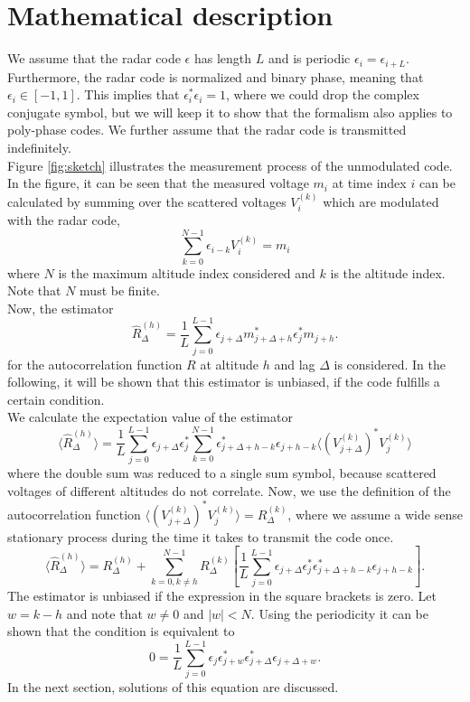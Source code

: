 \documentclass[18pt,a4paper]{extarticle}
\begin{document}
\section{Mathematical description}
We assume that the radar code $\epsilon$ has length $L$ and is periodic $\epsilon_i = \epsilon_{i + L}$.
Furthermore, the radar code is normalized and binary phase, meaning that $\epsilon_i \in [-1, 1]$.
This implies that $\epsilon_i^*\epsilon_i = 1$, where we could drop the complex conjugate symbol, but we will keep it to show that the formalism also applies to poly-phase codes.
We further assume that the radar code is transmitted indefinitely.\\
Figure \ref{fig:sketch} illustrates the measurement process of the unmodulated code.
In the figure, it can be seen that the measured voltage $m_i$ at time index $i$ can be calculated by summing over the scattered voltages $V^{(k)}_i$ which are modulated with the radar code,
\begin{equation}
\sum_{k=0}^{N-1} \epsilon_{i-k} V^{(k)}_i = m_i
\end{equation}
where $N$ is the maximum altitude index considered and $k$ is the altitude index.
Note that $N$ must be finite.\\
Now, the estimator
\begin{equation}
\hat{R}^{(h)}_\Delta = \frac{1}{L}\sum^{L-1}_{j=0}\epsilon_{j + \Delta}m_{j + \Delta + h}^* \epsilon_j^*m_{j + h}.
\end{equation}
for the autocorrelation function $R$ at altitude $h$ and lag $\Delta$ is considered.
In the following, it will be shown that this estimator is unbiased, if the code fulfills a certain condition.\\
We calculate the expectation value of the estimator
\begin{equation}
\langle \hat{R}^{(h)}_\Delta \rangle
=\frac{1}{L}\sum^{L - 1}_{j=0} \epsilon_{j + \Delta}\epsilon_j^* \sum_{k=0}^{N-1} \epsilon_{j+\Delta+h-k}^*\epsilon_{j+h-k} \langle (V^{(k)}_{j + \Delta})^*V^{(k)}_j \rangle
\end{equation}
where the double sum was reduced to a single sum symbol, because scattered voltages of different altitudes do not correlate.
Now, we use the definition of the autocorrelation function $\langle (V_{j+\Delta}^{(k)})^* V_j^{(k)} \rangle = R^{(k)}_\Delta$, where we assume a wide sense stationary process during the time it takes to transmit the code once.
\begin{equation}
\langle \hat{R}^{(h)}_\Delta \rangle
= R^{(h)}_\Delta + \sum_{k=0,k\neq h}^{N-1}R^{(k)}_\Delta
\left[ \frac{1}{L}\sum^{L-1}_{j=0}\epsilon_{j + \Delta}\epsilon_j^* \epsilon_{j+\Delta+h-k}^*\epsilon_{j+h-k}\right].
\end{equation}
The estimator is unbiased if the expression in the square brackets is zero.
Let $w = k - h$ and note that $w \neq 0$ and $|w| < N$.
Using the periodicity it can be shown that the condition is equivalent to
\begin{equation}
0 = \frac{1}{L}\sum^{L-1}_{j=0}\epsilon_{j}\epsilon_{j+w}^* \epsilon_{j+\Delta}^*\epsilon_{j + \Delta + w}.
\label{eq:cond}
\end{equation}
In the next section, solutions of this equation are discussed.
\end{document}
